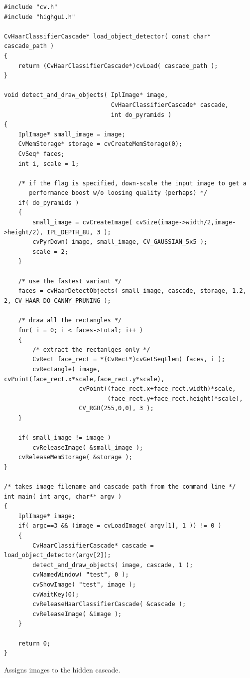 \ifC
\begin{lstlisting}
#include "cv.h"
#include "highgui.h"

CvHaarClassifierCascade* load_object_detector( const char* cascade_path )
{
    return (CvHaarClassifierCascade*)cvLoad( cascade_path );
}

void detect_and_draw_objects( IplImage* image,
                              CvHaarClassifierCascade* cascade,
                              int do_pyramids )
{
    IplImage* small_image = image;
    CvMemStorage* storage = cvCreateMemStorage(0);
    CvSeq* faces;
    int i, scale = 1;

    /* if the flag is specified, down-scale the input image to get a
       performance boost w/o loosing quality (perhaps) */
    if( do_pyramids )
    {
        small_image = cvCreateImage( cvSize(image->width/2,image->height/2), IPL_DEPTH_8U, 3 );
        cvPyrDown( image, small_image, CV_GAUSSIAN_5x5 );
        scale = 2;
    }

    /* use the fastest variant */
    faces = cvHaarDetectObjects( small_image, cascade, storage, 1.2, 2, CV_HAAR_DO_CANNY_PRUNING );

    /* draw all the rectangles */
    for( i = 0; i < faces->total; i++ )
    {
        /* extract the rectanlges only */
        CvRect face_rect = *(CvRect*)cvGetSeqElem( faces, i );
        cvRectangle( image, cvPoint(face_rect.x*scale,face_rect.y*scale),
                     cvPoint((face_rect.x+face_rect.width)*scale,
                             (face_rect.y+face_rect.height)*scale),
                     CV_RGB(255,0,0), 3 );
    }

    if( small_image != image )
        cvReleaseImage( &small_image );
    cvReleaseMemStorage( &storage );
}

/* takes image filename and cascade path from the command line */
int main( int argc, char** argv )
{
    IplImage* image;
    if( argc==3 && (image = cvLoadImage( argv[1], 1 )) != 0 )
    {
        CvHaarClassifierCascade* cascade = load_object_detector(argv[2]);
        detect_and_draw_objects( image, cascade, 1 );
        cvNamedWindow( "test", 0 );
        cvShowImage( "test", image );
        cvWaitKey(0);
        cvReleaseHaarClassifierCascade( &cascade );
        cvReleaseImage( &image );
    }

    return 0;
}
\end{lstlisting}


Assigns images to the hidden cascade.

